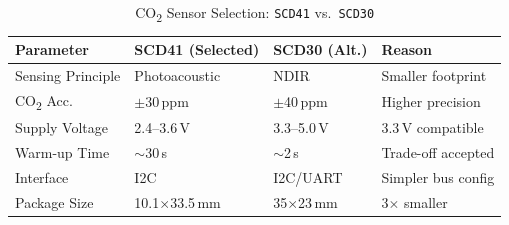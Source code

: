 \documentclass[conference]{IEEEtran}
\begin{document}
\begin{table}[htbp]
\caption{CO\textsubscript{2} Sensor Selection: \texttt{SCD41} vs.\ \texttt{SCD30}}
\label{tab:sensor_comparison}
\centering
\footnotesize
\renewcommand{\arraystretch}{1.4}
\begin{tabular}{|p{1.6cm}|p{1.6cm}|p{1.5cm}|p{1.8cm}|}
\hline
\textbf{Parameter} & \textbf{SCD41 (Selected)} & \textbf{SCD30 (Alt.)} & \textbf{Reason} \\
\hline
Sensing Principle        & Photoacoustic        & NDIR             & Smaller footprint     \\
\hline
CO\textsubscript{2} Acc. & $\pm$30\,ppm         & $\pm$40\,ppm     & Higher precision      \\
\hline
Supply Voltage           & 2.4--3.6\,V          & 3.3--5.0\,V      & 3.3\,V compatible     \\
\hline
Warm-up Time             & $\sim$30\,s          & $\sim$2\,s       & Trade-off accepted    \\
\hline
Interface                & I2C                  & I2C/UART         & Simpler bus config    \\
\hline
Package Size             & 10.1$\times$33.5\,mm & 35$\times$23\,mm & 3$\times$ smaller     \\
\hline
\end{tabular}
\end{table}
\end{document}
